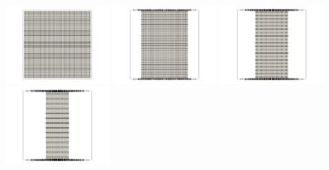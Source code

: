 \begin{center}
\includegraphics[width=4cm]{python_codes/fieldstone_89/results/biaxial/new_dirs0000}
\includegraphics[width=4cm]{python_codes/fieldstone_89/results/biaxial/new_dirs0005}
\includegraphics[width=4cm]{python_codes/fieldstone_89/results/biaxial/new_dirs0010}
\includegraphics[width=4cm]{python_codes/fieldstone_89/results/biaxial/new_dirs0015}
\end{center}

